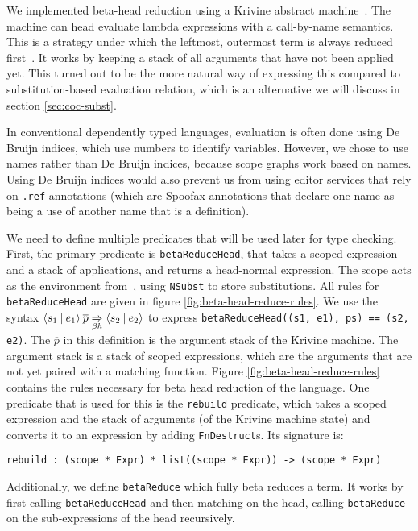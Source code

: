 We implemented beta-head reduction using a Krivine abstract machine~\cite{krivine}. The machine can head evaluate lambda expressions with a call-by-name semantics. This is a strategy under which the leftmost, outermost term is always reduced first~\cite{tapl}. It works by keeping a stack of all arguments that have not been applied yet. This turned out to be the more natural way of expressing this compared to substitution-based evaluation relation, which is an alternative we will discuss in section \ref{sec:coc-subst}.

In conventional dependently typed languages, evaluation is often done using De Bruijn indices, which use numbers to identify variables. However, we chose to use names rather than De Bruijn indices, because scope graphs work based on names. Using De Bruijn indices would also prevent us from using editor services that rely on \verb|.ref| annotations (which are Spoofax annotations that declare one name as being a use of another name that is a definition).

We need to define multiple predicates that will be used later for type checking. First, the primary predicate is \verb|betaReduceHead|, that takes a scoped expression and a stack of applications, and returns a head-normal expression. The scope acts as the environment from~\cite{krivine}, using \verb|NSubst| to store substitutions. All rules for \verb|betaReduceHead| are given in figure \ref{fig:beta-head-reduce-rules}. We use the syntax $\langle s_1 \: | \: e_1\rangle \: \overline{p} \underset{\beta h}{\Rightarrow} \langle s_2 \: | \: e_2\rangle$ to express \verb|betaReduceHead((s1, e1), ps) == (s2, e2)|. The $\overline{p}$ in this definition is the argument stack of the Krivine machine. The argument stack is a stack of scoped expressions, which are the arguments that are not yet paired with a matching function. Figure \ref{fig:beta-head-reduce-rules} contains the rules necessary for beta head reduction of the language. One predicate that is used for this is the \verb|rebuild| predicate, which takes a scoped expression and the stack of arguments (of the Krivine machine state) and converts it to an expression by adding \verb|FnDestruct|s. Its signature is:
\begin{lstlisting}
rebuild : (scope * Expr) * list((scope * Expr)) -> (scope * Expr)
\end{lstlisting}

Additionally, we define \verb|betaReduce| which fully beta reduces a term. It works by first calling \verb|betaReduceHead| and then matching on the head, calling \verb|betaReduce| on the sub-expressions of the head recursively.

